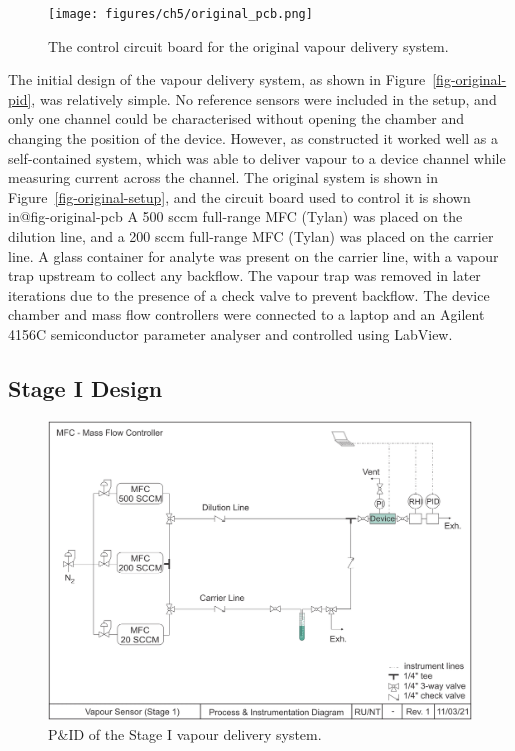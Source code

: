 \documentclass[
  a4paper,
]{scrbook}
\begin{document}
\begin{figure}

{\centering \texttt{[image: figures/ch5/original\_pcb.png]}

}

\caption{\label{fig-original-pcb}The control circuit board for the
original vapour delivery system.}

\end{figure}

The initial design of the vapour delivery system, as shown in
Figure~\ref{fig-original-pid}, was relatively simple. No reference
sensors were included in the setup, and only one channel could be
characterised without opening the chamber and changing the position of
the device. However, as constructed it worked well as a self-contained
system, which was able to deliver vapour to a device channel while
measuring current across the channel. The original system is shown in
Figure~\ref{fig-original-setup}, and the circuit board used to control
it is shown in@fig-original-pcb A 500 sccm full-range MFC (Tylan) was
placed on the dilution line, and a 200 sccm full-range MFC (Tylan) was
placed on the carrier line. A glass container for analyte was present on
the carrier line, with a vapour trap upstream to collect any backflow.
The vapour trap was removed in later iterations due to the presence of a
check valve to prevent backflow. The device chamber and mass flow
controllers were connected to a laptop and an Agilent 4156C
semiconductor parameter analyser and controlled using LabView.

\hypertarget{sec-vapour-system-design-1}{%
\subsection{Stage I Design}\label{sec-vapour-system-design-1}}

\begin{figure}

{\centering \includegraphics[width=1\textwidth,height=\textheight]{figures/ch5/PID_V1.png}

}

\caption{\label{fig-stage-1-pid}P\&ID of the Stage I vapour delivery
system.}

\end{figure}
\end{document}
